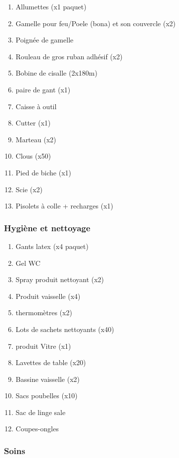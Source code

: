 \documentclass{article}
\begin{document}
\begin{enumerate}
    \item Allumettes (x1 paquet)
    \item Gamelle pour feu/Poele (bona) et son couvercle  (x2)
    \item Poignée de gamelle
    \item Rouleau de gros ruban adhésif (x2)
    \item Bobine de cisalle (2x180m)
    \item paire de gant (x1)
    \item Caisse à outil
    \item Cutter (x1)
    \item Marteau (x2)
    \item Clous (x50)
    \item Pied de biche (x1)
    \item Scie (x2)
    \item Pisolets à colle + recharges (x1)
\end{enumerate}

\subsubsection{Hygiène et nettoyage}

\begin{enumerate}
    \item Gants latex (x4 paquet)
    \item Gel WC
    \item Spray produit nettoyant  (x2)
    \item Produit vaisselle (x4)
    \item thermomètres (x2)
    \item Lots de sachets nettoyants (x40)
    \item produit Vitre (x1)
    \item Lavettes de table (x20)
    \item Bassine vaisselle (x2)
    \item Sacs poubelles (x10)
    \item Sac de linge sale 
    \item Coupes-ongles
    
\end{enumerate}

\subsubsection{Soins}
\end{document}
